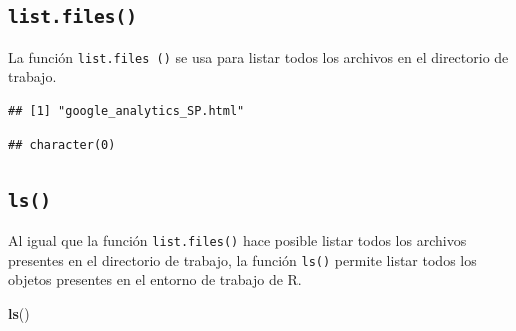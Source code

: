 \documentclass[
]{book}
\newenvironment{Shaded}{\begin{snugshade}}{\end{snugshade}}
\newcommand{\CommentTok}[1]{\textcolor[rgb]{0.56,0.35,0.01}{\textit{#1}}}
\newcommand{\DataTypeTok}[1]{\textcolor[rgb]{0.13,0.29,0.53}{#1}}
\newcommand{\KeywordTok}[1]{\textcolor[rgb]{0.13,0.29,0.53}{\textbf{#1}}}
\newcommand{\NormalTok}[1]{#1}
\newcommand{\StringTok}[1]{\textcolor[rgb]{0.31,0.60,0.02}{#1}}
\begin{document}
\hypertarget{l015listfiles}{%
\subsection{\texorpdfstring{\texttt{list.files()}}{list.files()}}\label{l015listfiles}}

La función \texttt{list.files\ ()} se usa para listar todos los archivos en el directorio de trabajo.

\begin{Shaded}
\end{Shaded}

\begin{verbatim}
## [1] "google_analytics_SP.html"
\end{verbatim}

\begin{Shaded}
\end{Shaded}

\begin{verbatim}
## character(0)
\end{verbatim}

\hypertarget{l015ls}{%
\subsection{\texorpdfstring{\texttt{ls()}}{ls()}}\label{l015ls}}

Al igual que la función \texttt{list.files()} hace posible listar todos los archivos presentes en el directorio de trabajo, la función \texttt{ls()} permite listar todos los objetos presentes en el entorno de trabajo de R.

\begin{Shaded}
\begin{Highlighting}[]
\KeywordTok{ls}\NormalTok{()}
\end{Highlighting}
\end{Shaded}
\end{document}
